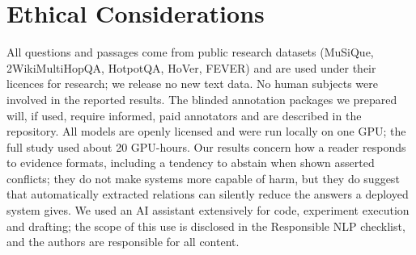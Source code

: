 \section*{Ethical Considerations}
\label{sec:ethics}

All questions and passages come from public research datasets (MuSiQue, 2WikiMultiHopQA, HotpotQA, HoVer, FEVER) and are used under their licences for research; we release no new text data. No human subjects were involved in the reported results. The blinded annotation packages we prepared will, if used, require informed, paid annotators and are described in the repository. All models are openly licensed and were run locally on one GPU; the full study used about 20 GPU-hours. Our results concern how a reader responds to evidence formats, including a tendency to abstain when shown asserted conflicts; they do not make systems more capable of harm, but they do suggest that automatically extracted relations can silently reduce the answers a deployed system gives. We used an AI assistant extensively for code, experiment execution and drafting; the scope of this use is disclosed in the Responsible NLP checklist, and the authors are responsible for all content.
